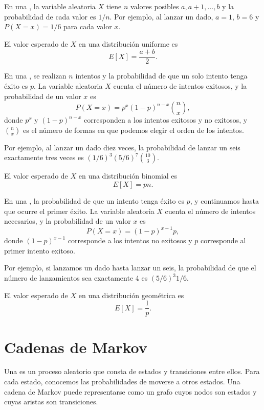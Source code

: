 En una ,
la variable aleatoria $X$ tiene $n$ valores posibles
$a,a+1,\ldots,b$ y la probabilidad de cada valor es $1/n$.
Por ejemplo, al lanzar un dado,
$a=1$, $b=6$ y $P(X=x)=1/6$ para cada valor $x$.

El valor esperado de $X$ en una distribución uniforme es
\[E[X] = \frac{a+b}{2}.\]

En una , se realizan $n$ intentos
y la probabilidad de que un solo intento tenga éxito
es $p$.
La variable aleatoria $X$ cuenta el número de
intentos exitosos,
y la probabilidad de un valor $x$ es
\[P(X=x)=p^x (1-p)^{n-x} {n \choose x},\]
donde $p^x$ y $(1-p)^{n-x}$ corresponden a
los intentos exitosos y no exitosos,
y ${n \choose x}$ es el número de formas
en que podemos elegir el orden de los intentos.

Por ejemplo, al lanzar un dado diez veces,
la probabilidad de lanzar un seis exactamente
tres veces es $(1/6)^3 (5/6)^7 {10 \choose 3}$.

El valor esperado de $X$ en una distribución binomial es
\[E[X] = pn.\]

En una ,
la probabilidad de que un intento tenga éxito es $p$,
y continuamos hasta que ocurre el primer éxito.
La variable aleatoria $X$ cuenta el número
de intentos necesarios, y la probabilidad de
un valor $x$ es
\[P(X=x)=(1-p)^{x-1} p,\]
donde $(1-p)^{x-1}$ corresponde a los intentos no exitosos
y $p$ corresponde al primer intento exitoso.

Por ejemplo, si lanzamos un dado hasta lanzar un seis,
la probabilidad de que el número de lanzamientos
sea exactamente 4 es $(5/6)^3 1/6$.

El valor esperado de $X$ en una distribución geométrica es
\[E[X]=\frac{1}{p}.\]

\section{Cadenas de Markov}


Una 
es un proceso aleatorio
que consta de estados y transiciones entre ellos.
Para cada estado, conocemos las probabilidades
de moverse a otros estados.
Una cadena de Markov puede representarse como un grafo
cuyos nodos son estados y cuyas aristas son transiciones.

